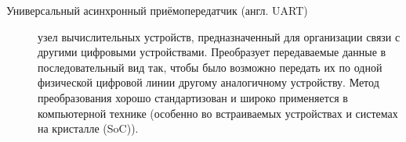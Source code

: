 \begin{description}
\item[Универсальный асинхронный приёмопередатчик (англ. UART)]
узел вычислительных устройств, предназначенный для организации связи с другими цифровыми устройствами. Преобразует передаваемые данные в последовательный вид так, чтобы было возможно передать их по одной физической цифровой линии другому аналогичному устройству. Метод преобразования хорошо стандартизован и широко применяется в компьютерной технике (особенно во встраиваемых устройствах и системах на кристалле (SoC)).


\end{description}

